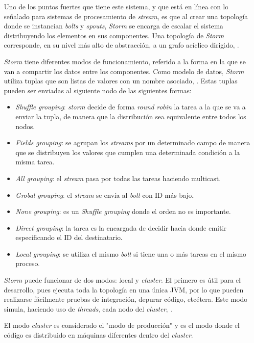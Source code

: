 Uno de los puntos fuertes que tiene este sistema, y que está en línea con lo señalado para sistemas de procesamiento de \textit{stream}, es que al crear una topología donde se instancian \textit{bolts} y \textit{spouts}, \textit{Storm} se encarga de escalar el sistema distribuyendo los elementos en sus componentes. Una topología de \textit{Storm} corresponde, en su nivel más alto de abstracción, a un grafo acíclico dirigido, \cite{Storm}.

\textit{Storm} tiene diferentes modos de funcionamiento, referido a la forma en la que se van a compartir los datos entre los componentes. Como modelo de datos, \textit{Storm} utiliza tuplas que son listas de valores con un nombre asociado, \cite{Storm}. Estas tuplas pueden ser enviadas al siguiente nodo de las siguientes formas:

\begin{itemize}
\item \textit{Shuffle grouping}: \textit{storm} decide de forma \textit{round robin} la tarea a la que se va a enviar la tupla, de manera que la distribución sea equivalente entre todos los nodos.
\item \textit{Fields grouping}: se agrupan los \textit{streams} por un determinado campo de manera que se distribuyen los valores que cumplen una determinada condición a la misma tarea.
\item \textit{All grouping}: el \textit{stream} pasa por todas las tareas haciendo multicast.
\item \textit{Grobal grouping}: el \textit{stream} se envía al \textit{bolt} con ID más bajo.
\item \textit{None grouping}: es un \textit{Shuffle grouping} donde el orden no es importante.
\item \textit{Direct grouping}: la tarea es la encargada de decidir hacia donde emitir especificando el ID del destinatario.
\item \textit{Local grouping}: se utiliza el mismo \textit{bolt} si tiene una o más tareas en el mismo proceso.
\end{itemize}

\textit{Storm} puede funcionar de dos modos: local y \textit{cluster}. El primero es útil para el desarrollo, pues ejecuta toda la topología en una única JVM, por lo que pueden realizarse fácilmente pruebas de integración, depurar código, etcétera. Este modo simula, haciendo uso de \textit{threads}, cada nodo del \textit{cluster}, \cite{Storm}.

El modo \textit{cluster} es considerado el "modo de producción" y es el modo donde el código es distribuido en máquinas diferentes dentro del \textit{cluster}.

